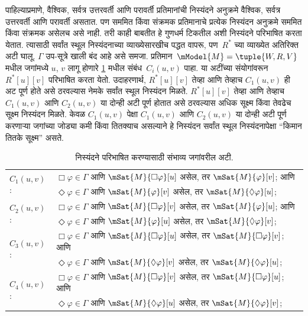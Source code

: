 पाहिल्याप्रमाणे, वैश्विक, सर्वत्र उत्तरवर्ती आणि परावर्ती
प्रतिमानांची निस्यंदने अनुक्रमे वैश्विक, सर्वत्र उत्तरवर्ती
आणि परावर्ती असतात. पण सममित किंवा संक्रमक प्रतिमानाचे
प्रत्येक निस्यंदन अनुक्रमे सममित किंवा संक्रमक असेलच असे नाही.
तरी काही बाबतीत हे गुणधर्म टिकतील अशी निस्यंदने
परिभाषित करता येतात. त्यासाठी सर्वांत स्थूल निस्यंदनाच्या
व्याख्येसारखीच पद्धत वापरू, पण~$R^*$ च्या व्याख्येत
अतिरिक्त अटी घालू. $\Gamma$ उप-सूत्रे खाली बंद
आहे असे समजा. प्रतिमान~$\mModel{M} =\tuple{W, R, V}$
मधील जगांमध्ये $u$, $v$ लागू होणारे
\ref{nml:fil:acc:tab:Cn-filtrations} मधील संबंध~$C_i(u,v)$ पाहा.
या अटींच्या संयोगांवरून $R^*[u][v]$ परिभाषित करता येतो.
उदाहरणार्थ, $R^*[u][v]$ तेव्हा आणि तेव्हाच $C_1(u,v)$
ही अट पूर्ण होते असे ठरवल्यास नेमके सर्वांत स्थूल
निस्यंदन मिळते. $R^*[u][v]$ तेव्हा आणि तेव्हाच
$C_1(u,v)$ आणि $C_2(u, v)$ या दोन्ही अटी पूर्ण होतात
असे ठरवल्यास अधिक सूक्ष्म किंवा तेवढेच सूक्ष्म निस्यंदन मिळते. केवळ $C_1(u,v)$
पेक्षा $C_1(u,v)$ आणि $C_2(u,v)$ या दोन्ही अटी पूर्ण
करणाऱ्या जगांच्या जोड्या कमी किंवा तितक्याच असल्याने हे निस्यंदन
सर्वांत स्थूल निस्यंदनापेक्षा “किमान तितके सूक्ष्म” असते.

\begin{table}[ht]
  \centering
  \begin{tabular}{|ll|}
    \hline
    \multirow{2}{*}{$C_1(u,v)$:}
    &
      $\Box\varphi \in \Gamma$ आणि $\mSat{M}{\Box\varphi}[u]$ असेल,
      तर $\mSat{M}{\varphi}[v]$; आणि\\
    &
      $\Diamond\varphi \in \Gamma$ आणि $\mSat{M}{\varphi}[v]$ असेल,
      तर $\mSat{M}{\Diamond\varphi}[u]$; \\
    \hline
    \multirow{2}{*}{$C_2(u,v)$:}
    &
      $\Box\varphi \in \Gamma$ आणि $\mSat{M}{\Box\varphi}[v]$ असेल,
      तर $\mSat{M}{\varphi}[u]$; आणि\\
    &
      $\Diamond\varphi \in \Gamma$ आणि $\mSat{M}{\varphi}[u]$ असेल,
      तर $\mSat{M}{\Diamond\varphi}[v]$; \\
    \hline
    \multirow{2}{*}{$C_3(u,v)$:}
    &
      $\Box\varphi \in \Gamma$ आणि $\mSat{M}{\Box\varphi}[u]$ असेल,
      तर $\mSat{M}{\Box\varphi}[v]$; आणि\\
    &
      $\Diamond\varphi \in \Gamma$ आणि $\mSat{M}{\Diamond\varphi}[v]$ असेल,
      तर $\mSat{M}{\Diamond\varphi}[u]$; \\
    \hline
    \multirow{2}{*}{$C_4(u,v)$:}
    &
      $\Box\varphi \in \Gamma$ आणि $\mSat{M}{\Box\varphi}[v]$ असेल,
      तर $\mSat{M}{\Box\varphi}[u]$; आणि\\
    &
      $\Diamond\varphi \in \Gamma$ आणि $\mSat{M}{\Diamond\varphi}[u]$ असेल,
      तर $\mSat{M}{\Diamond\varphi}[v]$; \\
    \hline
    \end{tabular}
  \caption{निस्यंदने परिभाषित करण्यासाठी संभाव्य जगांवरील अटी.}
  \label{nml:fil:acc:tab:Cn-filtrations}
\end{table}

